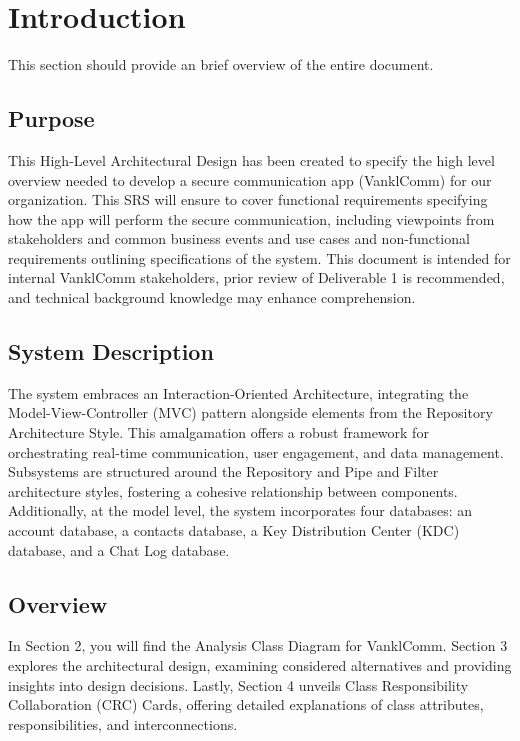 \documentclass[]{article}
\begin{document}
\newpage
\section{Introduction}
\label{sec:introduction}

This section should provide an brief overview of the entire document.

\subsection{Purpose}
\label{sub:purpose}
This High-Level Architectural Design has been created to specify the high level overview needed to develop a secure communication app (VanklComm) for our organization. This SRS will ensure to cover functional requirements specifying how the app will perform the secure communication, including viewpoints from stakeholders and common business events and use cases and non-functional requirements outlining specifications of the system.
\newline\newline
This document is intended for internal VanklComm stakeholders, prior review of Deliverable 1 is recommended, and technical background knowledge may enhance comprehension.

\subsection{System Description}
\label{sub:system_description}
The system embraces an Interaction-Oriented Architecture, integrating the Model-View-Controller (MVC) pattern alongside elements from the Repository Architecture Style. This amalgamation offers a robust framework for orchestrating real-time communication, user engagement, and data management.
\newline\newline
Subsystems are structured around the Repository and Pipe and Filter architecture styles, fostering a cohesive relationship between components. Additionally, at the model level, the system incorporates four databases: an account database, a contacts database, a Key Distribution Center (KDC) database, and a Chat Log database.

\subsection{Overview}
\label{sub:overview}
In Section 2, you will find the Analysis Class Diagram for VanklComm. Section 3 explores the architectural design, examining considered alternatives and providing insights into design decisions. Lastly, Section 4 unveils Class Responsibility Collaboration (CRC) Cards, offering detailed explanations of class attributes, responsibilities, and interconnections.
\end{document}
